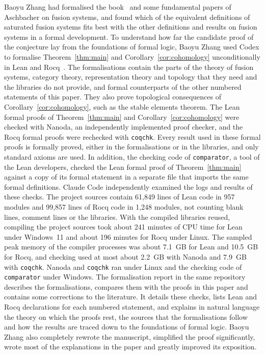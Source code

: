 \documentclass[10pt]{amsart}
\theoremstyle{definition}
\numberwithin{equation}{section}
\begin{document}
Baoyu Zhang had formalised the book~\cite{Craven} and some fundamental papers of Aschbacher on fusion systems, and found which of the equivalent definitions of saturated fusion systems fits best with the other definitions and results on fusion systems in a formal development. To understand how far the candidate proof of the conjecture lay from the foundations of formal logic, Baoyu Zhang used Codex to formalise Theorem~\ref{thm:main} and Corollary~\ref{cor:cohomology} unconditionally in Lean and Rocq~\cite{ZZformal}. The formalisations contain the parts of the theory of fusion systems, category theory, representation theory and topology that they need and the libraries do not provide, and formal counterparts of the other numbered statements of this paper. They also prove topological consequences of Corollary~\ref{cor:cohomology}, such as the stable elements theorem. The Lean formal proofs of Theorem~\ref{thm:main} and Corollary~\ref{cor:cohomology} were checked with Nanoda, an independently implemented proof checker, and the Rocq formal proofs were rechecked with \texttt{coqchk}. Every result used in these formal proofs is formally proved, either in the formalisations or in the libraries, and only standard axioms are used. In addition, the checking code of \texttt{comparator}, a tool of the Lean developers, checked the Lean formal proof of Theorem~\ref{thm:main} against a copy of its formal statement in a separate file that imports the same formal definitions. Claude Code independently examined the logs and results of these checks. The project sources contain 61,849 lines of Lean code in 957 modules and 99,857 lines of Rocq code in 1,248 modules, not counting blank lines, comment lines or the libraries. With the compiled libraries reused, compiling the project sources took about 241 minutes of CPU time for Lean under Windows~11 and about 196 minutes for Rocq under Linux. The sampled peak memory of the compiler processes was about 7.1~GB for Lean and 10.5~GB for Rocq, and checking used at most about 2.2~GB with Nanoda and 7.9~GB with \texttt{coqchk}. Nanoda and \texttt{coqchk} ran under Linux and the checking code of \texttt{comparator} under Windows. The formalisation report in the same repository~\cite{ZZformal} describes the formalisations, compares them with the proofs in this paper and contains some corrections to the literature. It details these checks, lists Lean and Rocq declarations for each numbered statement, and explains in natural language the theory on which the proofs rest, the sources that the formalisations follow and how the results are traced down to the foundations of formal logic. Baoyu Zhang also completely rewrote the manuscript, simplified the proof significantly, wrote most of the explanations in the paper and greatly improved its exposition.
\end{document}
